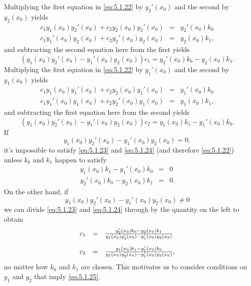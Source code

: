 \documentclass{ximera}
\begin{document}
Multiplying the first equation in \eqref{eq:5.1.22} by $y_2'(x_0)$
and the second by $y_2(x_0)$ yields
\begin{eqnarray*}
c_1y_1(x_0)y_2'(x_0)+c_2y_2(x_0)y_2'(x_0)&=& y_2'(x_0)k_0\\
c_1y_1'(x_0)y_2(x_0)+c_2y_2'(x_0)y_2(x_0)&=& y_2(x_0)k_1,
\end{eqnarray*}
and subtracting the second equation here from the first yields
\begin{equation}\label{eq:5.1.23}
\left(y_1(x_0)y_2'(x_0)-y_1'(x_0)y_2(x_0)\right)c_1=
y_2'(x_0)k_0-y_2(x_0)k_1.
\end{equation}
Multiplying the first equation in \eqref{eq:5.1.22} by $y_1'(x_0)$
and the second by $y_1(x_0)$ yields
\begin{eqnarray*}
c_1y_1(x_0)y_1'(x_0)+c_2y_2(x_0)y_1'(x_0)&=& y_1'(x_0)k_0\\
c_1y_1'(x_0)y_1(x_0)+c_2y_2'(x_0)y_1(x_0)&=& y_1(x_0)k_1,
\end{eqnarray*}
and subtracting the first equation here from the second yields
\begin{equation}\label{eq:5.1.24}
\left(y_1(x_0)y_2'(x_0)-y_1'(x_0)y_2(x_0)\right)c_2=
y_1(x_0)k_1-y_1'(x_0)k_0.
\end{equation}
If
$$
y_1(x_0)y_2'(x_0)-y_1'(x_0)y_2(x_0)=0,
$$
 it's impossible to satisfy \eqref{eq:5.1.23} and \eqref{eq:5.1.24}
(and therefore \eqref{eq:5.1.22})
unless $k_0$ and $k_1$ happen to satisfy
\begin{eqnarray*}
y_1(x_0)k_1-y_1'(x_0)k_0&=&0\\
y_2'(x_0)k_0-y_2(x_0)k_1&=&0.
\end{eqnarray*}
On the other hand, if
\begin{equation}\label{eq:5.1.25}
y_1(x_0)y_2'(x_0)-y_1'(x_0)y_2(x_0)\ne0
\end{equation}
 we can  divide \eqref{eq:5.1.23} and \eqref{eq:5.1.24} through by the
quantity on the left  to obtain
\begin{equation}\label{eq:5.1.26}
\begin{array}{rcl}
c_1&=&\frac{y_2'(x_0)k_0-y_2(x_0)k_1}
{y_1(x_0)y_2'(x_0)-y_1'(x_0)y_2(x_0)}\\[4\jot]
c_2&=&\frac{y_1(x_0)k_1-y_1'(x_0)k_0}
{y_1(x_0)y_2'(x_0)-y_1'(x_0)y_2(x_0)},
\end{array}
\end{equation}
no matter how $k_0$ and $k_1$ are chosen. This motivates us to
consider conditions on $y_1$ and $y_2$ that imply \eqref{eq:5.1.25}.
\end{document}
